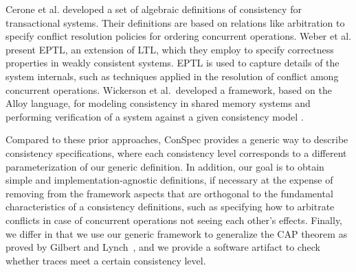 \documentclass[journal,compsoc]{IEEEtran}
\begin{document}
Cerone et al. \cite{DBLP:conf/concur/CeroneGY17} developed a set of algebraic definitions of consistency for transactional systems. Their definitions are based on relations like arbitration to specify conflict resolution policies for ordering concurrent operations.
 Weber et al. \cite{Weber2017} present EPTL, an extension of LTL,  which they employ to specify correctness properties in weakly consistent systems. EPTL is used to capture  details of the system internals, such as techniques applied in the resolution of conflict among concurrent operations. Wickerson et al.\ developed a framework, based on the Alloy language, for modeling consistency in shared memory systems and performing verification of a system against a given consistency model  \cite{Wickerson:2017:ACM:3009837.3009838}. 

Compared to these prior approaches, ConSpec provides a generic way to describe consistency specifications, where each consistency level corresponds to a different parameterization of our generic definition. In addition, our goal is to obtain simple and implementation-agnostic definitions, if necessary at the expense of removing from the framework aspects that are orthogonal to the fundamental characteristics of a consistency definitions, such as specifying how to arbitrate conflicts in case of concurrent operations not seeing each other's effects.
Finally, we differ in that we use our generic framework to generalize the CAP theorem as proved by Gilbert and Lynch~\cite{Gilbert:2002:BCF:564585.564601}, and we provide a software artifact to check whether traces meet a certain consistency level.
\end{document}

